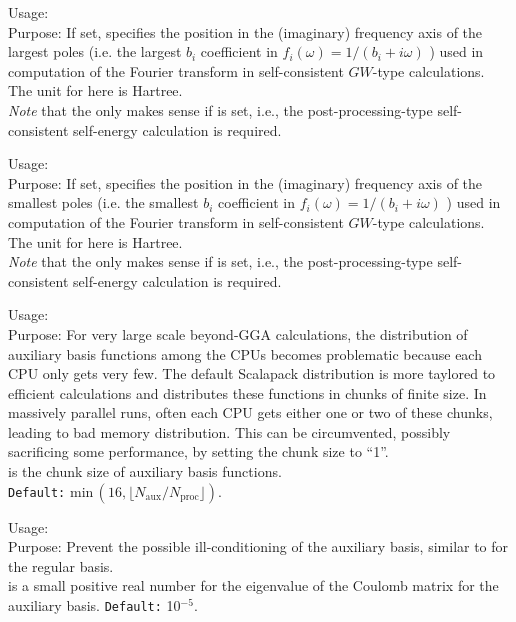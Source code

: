 { \noindent
  Usage:   \\[1.0ex]
  Purpose: If set, specifies the position in the (imaginary) frequency axis of the 
  largest poles (i.e. the largest $b_i$ coefficient in $f_i(\omega) = 1/(b_i +i\omega)$ ) 
  used in computation of the Fourier transform in self-consistent $GW$-type calculations. 
   The unit for  here is Hartree. \\[1.0ex]
}
\emph{Note} that the  only makes sense if
 is set, i.e., the post-processing-type self-consistent self-energy calculation
is required.

{ \noindent
  Usage:   \\[1.0ex]
  Purpose: If set, specifies the position in the (imaginary) frequency axis of the 
  smallest poles (i.e. the smallest $b_i$ coefficient in $f_i(\omega) = 1/(b_i +i\omega)$ ) 
  used in computation of the Fourier transform in self-consistent $GW$-type calculations. 
   The unit for  here is Hartree. \\[1.0ex]
}
\emph{Note} that the  only makes sense if
 is set, i.e., the post-processing-type self-consistent self-energy calculation
is required.


{ \noindent
  Usage:   \\[1.0ex]
  Purpose: For very large scale beyond-GGA calculations, the distribution of
  auxiliary basis functions among the CPUs becomes problematic because each
  CPU only gets very few.  The default Scalapack distribution is more taylored
  to efficient calculations and distributes these functions in chunks of
  finite size.  In massively parallel runs, often each CPU gets either one or
  two of these chunks, leading to bad memory distribution.  This can be
  circumvented, possibly sacrificing some performance, by setting the chunk
  size  to ``1''.
  \\[1.0ex]  
   is the chunk size of auxiliary basis functions.
  \\
  \texttt{Default:} $\mathrm{min}\,(16,
  \lfloor N_{\mathrm{aux}}/N_{\mathrm{proc}}\rfloor)$.
}

{ \noindent
  Usage:   \\[1.0ex]
  Purpose: Prevent the possible ill-conditioning of the auxiliary basis, similar
  to  for the regular basis.  \\[1.0ex]  
   is a small positive real number for the eigenvalue of the
   Coulomb matrix for the auxiliary basis. \texttt{Default:} 10$^{-5}$. 
}

